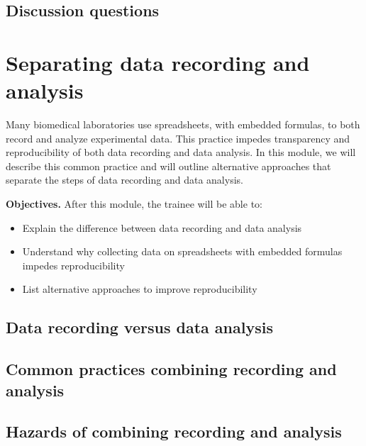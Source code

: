\documentclass[]{tufte-book}
\providecommand{\tightlist}{%
  \setlength{\itemsep}{0pt}\setlength{\parskip}{0pt}}
\begin{document}
\hypertarget{discussion-questions-11}{%
\subsection{Discussion questions}\label{discussion-questions-11}}

\hypertarget{separating-data-recording-and-analysis-12}{%
\section{Separating data recording and analysis}\label{separating-data-recording-and-analysis-12}}

Many biomedical laboratories use spreadsheets, with embedded formulas, to both
record and analyze experimental data. This practice impedes transparency and
reproducibility of both data recording and data analysis. In this module, we
will describe this common practice and will outline alternative approaches that
separate the steps of data recording and data analysis.

\textbf{Objectives.} After this module, the trainee will be able to:

\begin{itemize}
\tightlist
\item
  Explain the difference between data recording and data analysis
\item
  Understand why collecting data on spreadsheets with embedded formulas impedes
  reproducibility
\item
  List alternative approaches to improve reproducibility
\end{itemize}

\hypertarget{data-recording-versus-data-analysis-12}{%
\subsection{Data recording versus data analysis}\label{data-recording-versus-data-analysis-12}}

\hypertarget{common-practices-combining-recording-and-analysis-12}{%
\subsection{Common practices combining recording and analysis}\label{common-practices-combining-recording-and-analysis-12}}

\hypertarget{hazards-of-combining-recording-and-analysis-12}{%
\subsection{Hazards of combining recording and analysis}\label{hazards-of-combining-recording-and-analysis-12}}
\end{document}

